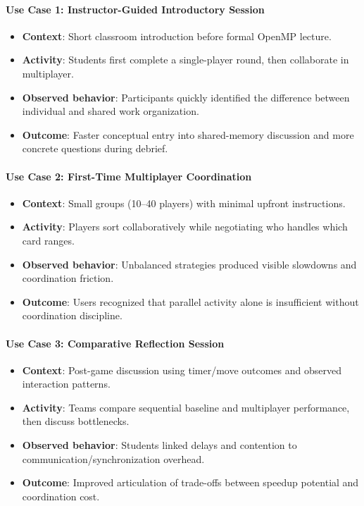 \paragraph*{Use Case 1: Instructor-Guided Introductory Session}
\begin{itemize}
    \item \textbf{Context}: Short classroom introduction before formal OpenMP lecture.
    \item \textbf{Activity}: Students first complete a single-player round, then collaborate in multiplayer.
    \item \textbf{Observed behavior}: Participants quickly identified the difference between individual and shared work organization.
    \item \textbf{Outcome}: Faster conceptual entry into shared-memory discussion and more concrete questions during debrief.
\end{itemize}

\paragraph*{Use Case 2: First-Time Multiplayer Coordination}
\begin{itemize}
    \item \textbf{Context}: Small groups (10--40 players) with minimal upfront instructions.
    \item \textbf{Activity}: Players sort collaboratively while negotiating who handles which card ranges.
    \item \textbf{Observed behavior}: Unbalanced strategies produced visible slowdowns and coordination friction.
    \item \textbf{Outcome}: Users recognized that parallel activity alone is insufficient without coordination discipline.
\end{itemize}

\paragraph*{Use Case 3: Comparative Reflection Session}
\begin{itemize}
    \item \textbf{Context}: Post-game discussion using timer/move outcomes and observed interaction patterns.
    \item \textbf{Activity}: Teams compare sequential baseline and multiplayer performance, then discuss bottlenecks.
    \item \textbf{Observed behavior}: Students linked delays and contention to communication/synchronization overhead.
    \item \textbf{Outcome}: Improved articulation of trade-offs between speedup potential and coordination cost.
\end{itemize}

